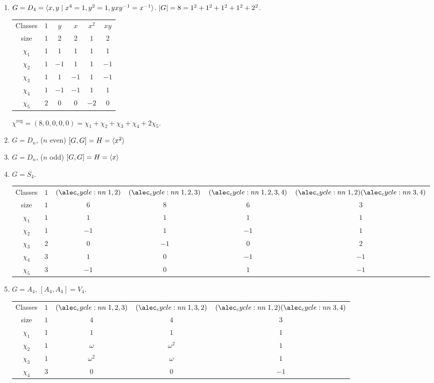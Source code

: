 \begin{enumerate}
  \item $G = D_4 = \langle x, y \mid x^4=1, y^2=1, yxy^{-1} = x^{-1}\rangle$.
    $\lvert G\rvert = 8 = 1^2 + 1^2 + 1^2 + 1^2 + 2^2$.
    \begin{center}
      \begin{tabular}{cccccc}
        Classes & $1$ & $y$ & $x$ & $x^2$ & $xy$ \\
        size & $1$ & $2$ & $2$ & $1$ & $2$ \\
        \hline
        $\chi_1$ & $1$ & $1$ & $1$ & $1$ & $1$ \\
        $\chi_2$ & $1$ & $-1$ & $1$ & $1$ & $-1$ \\
        $\chi_3$ & $1$ & $1$ & $-1$ & $1$ & $-1$ \\
        $\chi_4$ & $1$ & $-1$ & $-1$ & $1$ & $1$ \\
        $\chi_5$ & $2$ & $0$ & $0$ & $-2$ & $0$
      \end{tabular}
    \end{center}
    $\chi^\text{reg} = (8, 0, 0, 0, 0) = \chi_1 + \chi_2 + \chi_3 + \chi_4
    + 2\chi_5$.
  \item $G = D_n$, ($n$ even)
    $[G, G] = H = \langle x^2\rangle$
  \item $G = D_n$, ($n$ odd)
    $[G, G] = H = \langle x\rangle$
  \item $G = S_4$.
    \begin{center}
      \begin{tabular}{cccccc}
        Classes & $1$ & $\cycle{1,2}$ & $\cycle{1,2,3}$ & $\cycle{1,2,3,4}$
                & $\cycle{1,2}\cycle{3,4}$ \\
        size & $1$ & $6$ & $8$ & $6$ & $3$ \\
        \hline
        $\chi_1$ & $1$ & $1$ & $1$ & $1$ & $1$ \\
        $\chi_2$ & $1$ & $-1$ & $1$ & $-1$ & $1$ \\
        $\chi_3$ & $2$ & $0$ & $-1$ & $0$ & $2$ \\
        $\chi_4$ & $3$ & $1$ & $0$ & $-1$ & $-1$ \\
        $\chi_5$ & $3$ & $-1$ & $0$ & $1$ & $-1$
      \end{tabular}
    \end{center}
  \item $G = A_4$, $[A_4, A_4] = V_4$.
    \begin{center}
      \begin{tabular}{ccccc}
        Classes & $1$ & $\cycle{1,2,3}$ & $\cycle{1,3,2}$
                & $\cycle{1,2}\cycle{3,4}$ \\
        size & $1$ & $4$ & $4$ & $3$ \\
        \hline
        $\chi_1$ & $1$ & $1$ & $1$ & $1$ \\
        $\chi_2$ & $1$ & $\omega$ & $\omega^2$ & $1$ \\
        $\chi_3$ & $1$ & $\omega^2$ & $\omega$ & $1$ \\
        $\chi_4$ & $3$ & $0$ & $0$ & $-1$
      \end{tabular}
    \end{center}
\end{enumerate}

